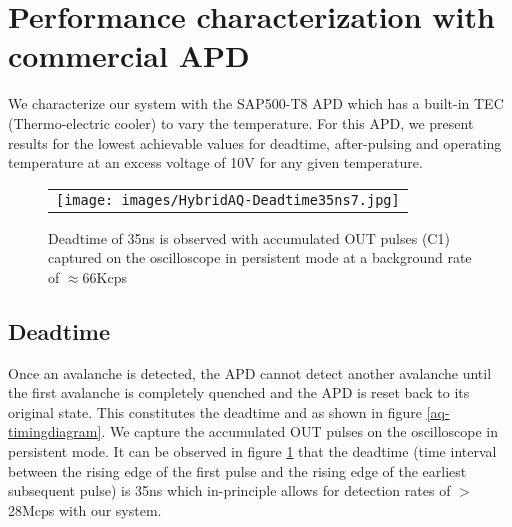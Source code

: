 \section{Performance characterization with commercial APD}
We characterize our system with the SAP500-T8 APD which has a built-in TEC (Thermo-electric cooler) to vary the temperature. For this APD, we present results for the lowest achievable values for deadtime, after-pulsing and operating temperature at an excess voltage of 10V for any given temperature.

\begin{figure} [ht]
\begin{center}
\begin{tabular}{c} 
\texttt{[image: images/HybridAQ-Deadtime35ns7.jpg]}\\
\end{tabular}
\end{center}
\caption[] 
{ \label{fig:deadtime} 
Deadtime of 35ns is observed with accumulated OUT pulses (C1) captured on the oscilloscope in persistent mode at a background rate of $\approx$66Kcps}
\end{figure} 

\subsection{Deadtime}
Once an avalanche is detected, the APD cannot detect another avalanche until the first avalanche is completely quenched and the APD is reset back to its original state. This constitutes the deadtime and as shown in figure \ref{aq-timingdiagram}. 
We capture the accumulated OUT pulses on the oscilloscope in persistent mode. It can be observed in figure \ref{fig:deadtime} that the deadtime (time interval between the rising edge of the first pulse and the rising edge of the earliest subsequent pulse) is 35ns which in-principle allows for detection rates of $>$28Mcps with our system. 

